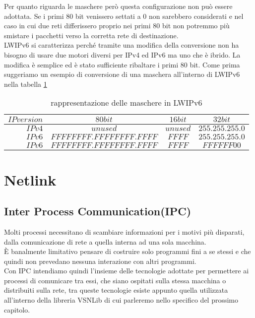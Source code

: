 Per quanto riguarda le maschere per\`o questa configurazione non pu\`o essere adottata. Se i primi 80 bit venissero settati a 0 non sarebbero considerati e nel caso in cui due reti differissero proprio nei primi 80 bit non potremmo pi\`u smistare i pacchetti verso la corretta rete di destinazione.\\
LWIPv6 si caratterizza perch\'e tramite una modifica della conversione non ha bisogno di usare due motori diversi per IPv4 ed IPv6 ma uno che \`e ibrido. La modifica \`e semplice ed \`e stato sufficiente ribaltare i primi 80 bit. Come prima suggeriamo un esempio di conversione di una maschera all'interno di LWIPv6 nella tabella \ref{tab:IPv4toIPv6 mask}

\begin{table}[h]                        %
\begin{center}                          %
\begin{tabular}{r|c|c|c}                  %
\hline
$IP version$ & $80 bit$ & $16 bit$ & $32 bit$\\
\hline  \hline        %
$IPv4$ & $unused$  &  $unused$  & $255.255.255.0$\\           %
\hline                                  %
$IPv6$ & $FFFFFFFF.FFFFFFFF.FFFF$ & $FFFF$ & $255.255.255.0$\\           %
\hline                                  %
$IPv6$ & $FFFFFFFF.FFFFFFFF.FFFF$ & $FFFF$ & $FFFFFF00$\\
\hline                           %
\end{tabular}
\caption[IPv4 to IPv6 mask conversion]{rappresentazione delle maschere in LWIPv6}\label{tab:IPv4toIPv6 mask}
\end{center}
\end{table}
\section{Netlink}
\subsection{Inter Process Communication(IPC)}
Molti processi necessitano di scambiare informazioni per i motivi pi\`u disparati, dalla comunicazione di rete a quella interna ad una sola macchina.\\
\`E banalmente limitativo pensare di costruire solo programmi fini a se stessi e che quindi non prevedano nessuna interazione con altri programmi.\\
Con IPC intendiamo quindi l'insieme delle tecnologie adottate per permettere ai processi di comunicare tra essi, che siano ospitati sulla stessa macchina o distribuiti sulla rete, tra queste tecnologie esiste appunto quella utilizzata all'interno della libreria VSNLib di cui parleremo nello specifico del prossimo capitolo.
